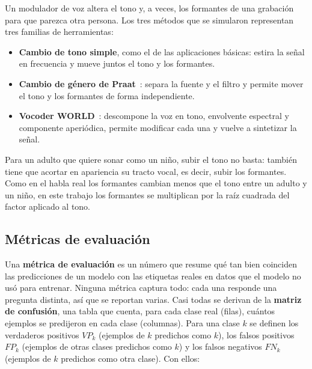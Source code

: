\documentclass[11pt,a4paper]{article}
\begin{document}
Un modulador de voz altera el tono y, a veces, los formantes de una grabación para que parezca otra persona. Los tres métodos que se simularon representan tres familias de herramientas:
\begin{itemize}
  \item \textbf{Cambio de tono simple}, como el de las aplicaciones básicas: estira la señal en frecuencia y mueve juntos el tono y los formantes.
  \item \textbf{Cambio de género de Praat}~\cite{praat}: separa la fuente y el filtro y permite mover el tono y los formantes de forma independiente.
  \item \textbf{Vocoder WORLD}~\cite{world2016}: descompone la voz en tono, envolvente espectral y componente aperiódica, permite modificar cada una y vuelve a sintetizar la señal.
\end{itemize}
Para un adulto que quiere sonar como un niño, subir el tono no basta: también tiene que acortar en apariencia su tracto vocal, es decir, subir los formantes. Como en el habla real los formantes cambian menos que el tono entre un adulto y un niño, en este trabajo los formantes se multiplican por la raíz cuadrada del factor aplicado al tono.

\subsection{Métricas de evaluación}
\label{sec:metricas}

Una \textbf{métrica de evaluación} es un número que resume qué tan bien coinciden las predicciones de un modelo con las etiquetas reales en datos que el modelo no usó para entrenar. Ninguna métrica captura todo: cada una responde una pregunta distinta, así que se reportan varias. Casi todas se derivan de la \textbf{matriz de confusión}, una tabla que cuenta, para cada clase real (filas), cuántos ejemplos se predijeron en cada clase (columnas). Para una clase $k$ se definen los verdaderos positivos $VP_k$ (ejemplos de $k$ predichos como $k$), los falsos positivos $FP_k$ (ejemplos de otras clases predichos como $k$) y los falsos negativos $FN_k$ (ejemplos de $k$ predichos como otra clase). Con ellos:
\end{document}
